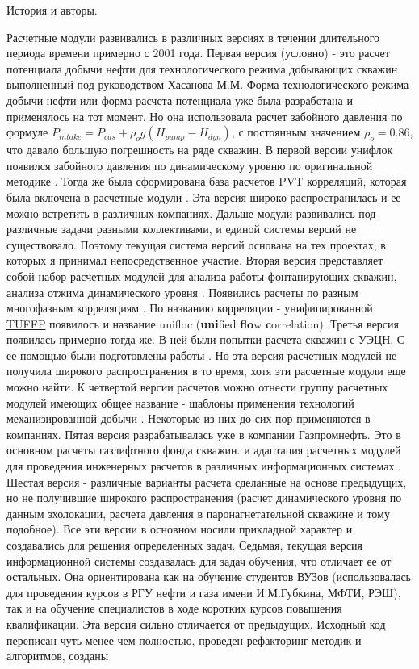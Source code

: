 \newpage
История и авторы.

Расчетные модули \unf{} развивались в различных версиях в течении длительного периода времени примерно с 2001 года. Первая версия (условно) - это расчет потенциала добычи нефти для технологического режима добывающих скважин выполненный под руководством Хасанова М.М. Форма технологического режима добычи нефти или форма расчета потенциала уже была разработана и применялось на тот момент. Но она использовала расчет забойного давления по формуле \(P_{intake} = P_{cas}+\rho_{o}g(H_{pump}-H_{dyn})\),  с постоянным значением \(\rho_{o} = 0.86\), что давало большую погрешность на ряде скважин. В первой версии унифлок появился забойного давления по динамическому уровню по оригинальной методике \cite{Khasanov_TR_2006}. Тогда же была сформирована база расчетов PVT корреляций, которая была включена в расчетные модули \cite{Yukos_PVT_2002}. Эта версия широко распространилась и ее можно встретить в различных компаниях. Дальше модули развивались под различные задачи разными коллективами, и единой системы версий не существовало. Поэтому текущая система версий основана на тех проектах, в которых я принимал непосредственное участие. Вторая версия представляет собой набор расчетных модулей для анализа работы фонтанирующих скважин, анализа отжима динамического уровня \cite{Khasanov_depress_test_2010, Khasanov_depress_test_SPE_2010}. Появились расчеты по разным многофазным корреляциям \cite{Khasanov_Unified_SPE_2006,Khabibullin_self_flow_2006}. По названию корреляции - унифицированной \href{http://www.tuffp.utulsa.edu/}{TUFFP} появилось и название unifloc (\textbf{uni}fied \textbf{flo}w \textbf{c}orrelation).  Третья версия появилась примерно тогда же. В ней были попытки расчета скважин с УЭЦН. С ее помощью были подготовлены работы \cite{SPE_117414_2008, SPE_117415_2008, SPE_120628}. Но эта версия расчетных модулей не получила широкого распространения в то время, хотя эти расчетные модули еще можно найти. К четвертой версии расчетов можно отнести группу расчетных модулей имеющих общее название - шаблоны применения технологий механизированной добычи \cite{AL_appl_patt_2007,AL_appl_patt_Vankor_2007}. Некоторые из них до сих пор применяются в компаниях. Пятая версия разрабатывалась уже в компании Газпромнефть. Это в основном расчеты газлифтного фонда скважин. и адаптация расчетных модулей для проведения инженерных расчетов в различных информационных системах \cite{Burtzev_Orenbung_gaslift_2015, offshore_gaslift_2015} . Шестая версия - различные варианты расчета сделанные на основе предыдущих, но не получившие широкого распространения (расчет динамического уровня по данным эхолокации, расчета давления в паронагнетательной скважине и тому подобное).  Все эти версии в основном носили прикладной характер и создавались для решения определенных задач. Седьмая, текущая версия информационной системы создавалась для задач обучения, что отличает ее от остальных. Она ориентирована как на обучение студентов ВУЗов (использовалась для проведения курсов в РГУ нефти и газа имени И.М.Губкина, МФТИ, РЭШ), так и на обучение специалистов в ходе коротких курсов повышения квалификации. Эта версия сильно отличается от предыдущих. Исходный код переписан чуть менее чем полностью, проведен рефакторинг методик и алгоритмов, созданы 